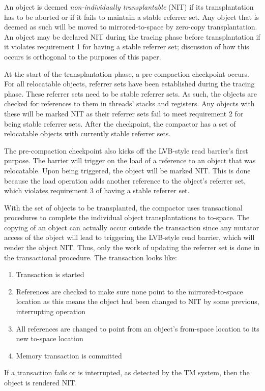 \documentclass{sig-alternate}
\begin{document}
An object is deemed \emph{non-individually transplantable} (NIT) if its transplantation
has to be aborted or if it fails to maintain a stable referrer set. 
Any object that is deemed as such will be moved to mirrored-to-space by zero-copy 
transplantation. An object may be declared NIT during the tracing phase before transplantation
if it violates requirement 1 for having a stable referrer set; discussion
of how this occurs is orthogonal to the purposes of this paper.

At the start of the transplantation phase, a pre-compaction checkpoint occurs.
For all relocatable objects, referrer sets have been established during the tracing phase.
These referrer sets need to be stable referrer sets. As such, the objects are checked for 
references to them in threads' stacks and registers. Any objects with these will be 
marked NIT as their referrer sets fail to meet requirement 2 for being stable referrer sets.
After the checkpoint, the compactor has a set of relocatable objects with currently stable referrer sets.

The pre-compaction checkpoint also kicks off the LVB-style read barrier's first purpose. 
The barrier will trigger on the load of a reference to an object that was 
relocatable. Upon being triggered, the object will be marked NIT. This is done because
the load operation adds another reference to the object's referrer set, which violates
requirement 3 of having a stable referrer set.

With the set of objects to be transplanted, the compactor uses transactional
procedures to complete the individual object transplantations to to-space.
The copying of an object can actually occur outside the transaction since any
mutator access of the object will lead to triggering the LVB-style read barrier,
which will render the object NIT. Thus, only the work of updating the referrer set
is done in the transactional procedure. The transaction looks like:
\begin{enumerate}
\item Transaction is started
\item References are checked to make sure none point to the mirrored-to-space location as this means the object had been changed to NIT by some previous, interrupting operation
\item All references are changed to point from an object's from-space location to its new to-space location
\item Memory transaction is committed
\end{enumerate}
If a transaction fails or is interrupted, as detected by the TM system, then the object is rendered NIT.
\end{document}
